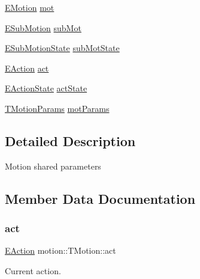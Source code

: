 \begin{DoxyCompactItemize}
\item 
\mbox{\hyperlink{motionEnums_8h_a907f80786f402332d43f4646dc1450bc}{E\+Motion}} \mbox{\hyperlink{structmotion_1_1TMotion_afd2a57c061f52c0e506ab9fba29558e4}{mot}}
\item 
\mbox{\hyperlink{motionEnums_8h_a23be5ef75af9219a8bf688fd9716d72c}{E\+Sub\+Motion}} \mbox{\hyperlink{structmotion_1_1TMotion_a5e9becca4a1f88a70dd4b97c65b737de}{sub\+Mot}}
\item 
\mbox{\hyperlink{motionEnums_8h_a272f94c6143b9acf7ac44f165be53948}{E\+Sub\+Motion\+State}} \mbox{\hyperlink{structmotion_1_1TMotion_a867be2dd284ef064809db4e384a722b2}{sub\+Mot\+State}}
\item 
\mbox{\hyperlink{motionEnums_8h_aa7486027d362655230b958efe6985a7f}{E\+Action}} \mbox{\hyperlink{structmotion_1_1TMotion_ac51f74a01dd87aacda81c14028a80ccf}{act}}
\item 
\mbox{\hyperlink{motionEnums_8h_ac80e838bea11b75469bfc14b1de921a3}{E\+Action\+State}} \mbox{\hyperlink{structmotion_1_1TMotion_a87ff7f273ed899eb720d3ef7ef8fe543}{act\+State}}
\item 
\mbox{\hyperlink{structmotion_1_1TMotionParams}{T\+Motion\+Params}} \mbox{\hyperlink{structmotion_1_1TMotion_a67eb890fbd74ee1c88a5d640a199dea4}{mot\+Params}}
\end{DoxyCompactItemize}


\subsection{Detailed Description}
Motion shared parameters ~\newline


\subsection{Member Data Documentation}
\mbox{\label{structmotion_1_1TMotion_ac51f74a01dd87aacda81c14028a80ccf}} 
\subsubsection{\texorpdfstring{act}{act}}
{\footnotesize\ttfamily \mbox{\hyperlink{motionEnums_8h_aa7486027d362655230b958efe6985a7f}{E\+Action}} motion\+::\+T\+Motion\+::act}

Current action. \mbox{\label{structmotion_1_1TMotion_a87ff7f273ed899eb720d3ef7ef8fe543}} 
